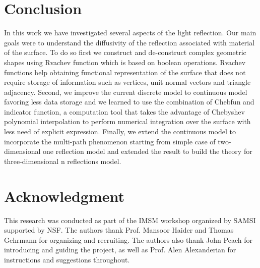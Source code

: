\documentclass[11pt,reqno]{amsart}
\theoremstyle{definition}
\begin{document}
\section{Conclusion}

In this work we have investigated several aspects of the light reflection. Our main goals were to understand the diffusivity of the reflection associated with material of the surface. To do so first we construct and de-construct complex geometric shapes using Rvachev function which is based on boolean operations. Rvachev functions help obtaining functional representation of the surface that does not require storage of information such as vertices, unit normal vectors and triangle adjacency.
Second, we improve the current discrete model to continuous model favoring less data storage and we learned to use the combination of Chebfun and indicator function, a computation tool that takes the advantage of Chebyshev polynomial interpolation to perform numerical integration over the surface with less need of explicit expression.
Finally, we extend the continuous model to incorporate the multi-path phenomenon starting from simple case of two-dimensional one reflection model and extended the result to build the theory for three-dimensional n reflections model.

\section{Acknowledgment}
This research was conducted as part of the IMSM workshop organized by SAMSI supported by NSF. The authors thank Prof. Mansoor Haider and Thomas Gehrmann for organizing and recruiting. The authors also thank John Peach for introducing and guiding the project, as well as Prof. Alen Alexanderian for instructions and suggestions throughout. 

\iffalse
\end{document}
